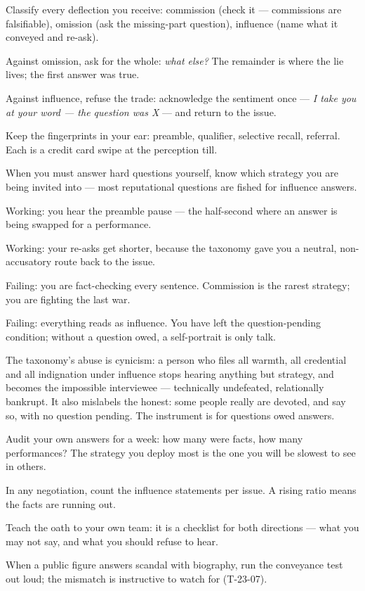 \begin{application}
  \item Classify every deflection you receive: commission (check it --- commissions are falsifiable), omission (ask the missing-part question), influence (name what it conveyed and re-ask).
  \item Against omission, ask for the whole: \emph{what else?} The remainder is where the lie lives; the first answer was true.
  \item Against influence, refuse the trade: acknowledge the sentiment once --- \emph{I take you at your word --- the question was X} --- and return to the issue.
  \item Keep the fingerprints in your ear: preamble, qualifier, selective recall, referral. Each is a credit card swipe at the perception till.
  \item When you must answer hard questions yourself, know which strategy you are being invited into --- most reputational questions are fished for influence answers.
\end{application}
\begin{feedback}
  \item Working: you hear the preamble pause --- the half-second where an answer is being swapped for a performance.
  \item Working: your re-asks get shorter, because the taxonomy gave you a neutral, non-accusatory route back to the issue.
  \item Failing: you are fact-checking every sentence. Commission is the rarest strategy; you are fighting the last war.
  \item Failing: everything reads as influence. You have left the question-pending condition; without a question owed, a self-portrait is only talk.
\end{feedback}
\begin{failure}
The taxonomy's abuse is cynicism: a person who files all warmth, all credential and all indignation under influence stops hearing anything but strategy, and becomes the impossible interviewee --- technically undefeated, relationally bankrupt. It also mislabels the honest: some people really are devoted, and say so, with no question pending. The instrument is for questions owed answers.
\end{failure}
\begin{countermeasures}
  \item Audit your own answers for a week: how many were facts, how many performances? The strategy you deploy most is the one you will be slowest to see in others.
  \item In any negotiation, count the influence statements per issue. A rising ratio means the facts are running out.
  \item Teach the oath to your own team: it is a checklist for both directions --- what you may not say, and what you should refuse to hear.
  \item When a public figure answers scandal with biography, run the conveyance test out loud; the mismatch is instructive to watch for (T-23-07).
\end{countermeasures}

\seesources
{}
